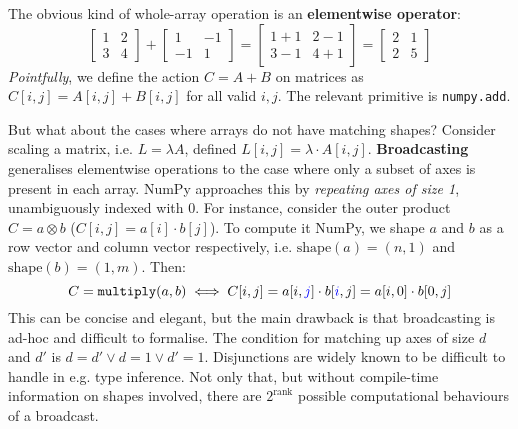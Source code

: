 The obvious kind of whole-array operation is an \textbf{elementwise operator}:
$$ \begin{bmatrix} 1 & 2 \\ 3 & 4 \end{bmatrix} 
+ \begin{bmatrix}1 & -1 \\ -1 & 1 \end{bmatrix}
= \begin{bmatrix}1 + 1 & 2 - 1 \\ 3 - 1 & 4 + 1 \end{bmatrix}
= \begin{bmatrix}2 & 1 \\ 2 & 5 \end{bmatrix} $$
\textit{Pointfully}, we define the action $C = A + B$ on matrices as $C[i, j] = A[i, j] + B[i, j]$ for all valid $i, j$. The relevant primitive is \texttt{numpy.add}. 

But what about the cases where arrays do not have matching shapes? Consider scaling a matrix, i.e. $L = \lambda A$, defined $L[i, j] = \lambda \cdot A[i, j]$. \textbf{Broadcasting} generalises elementwise operations to the case where only a subset of axes is present in each array. NumPy approaches this by \textit{repeating axes of size 1}, unambiguously indexed with $0$. For instance, consider the outer product $C = a \otimes b$ ($C[i, j] = a[i] \cdot b[j] $). To compute it NumPy, we shape $a$ and $b$ as a row vector and column vector respectively, i.e. $\mathrm{shape}(a) = (n, 1)$ and $\mathrm{shape}(b) = (1, m)$. Then:
$$ C = \texttt{multiply}(a, b) \iff C[i, j] = a[i, {\color{blue} j}] \cdot b[{\color{blue} i}, j] = a[i, 0] \cdot b[0, j] $$
This can be concise and elegant, but the main drawback is that broadcasting is ad-hoc and difficult to formalise. The condition for matching up axes of size $d$ and $d'$ is $d = d' \lor d = 1 \lor d' = 1 $. Disjunctions are widely known to be difficult to handle in e.g. type inference.
Not only that, but without compile-time information on shapes involved, there are $2^{\mathrm{rank}}$ possible computational behaviours of a broadcast.

